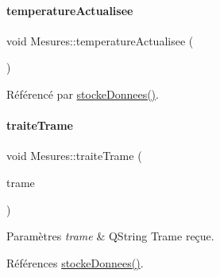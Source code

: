 \paragraph{\texorpdfstring{temperature\+Actualisee}{temperatureActualisee}}
{\footnotesize\ttfamily void Mesures\+::temperature\+Actualisee (\begin{DoxyParamCaption}\item[{double}]{ }\end{DoxyParamCaption})\hspace{0.3cm}{\ttfamily [signal]}}



Référencé par \hyperlink{class_mesures_a77652c2332a9234bf08b463d1d389aa5}{stocke\+Donnees()}.

\mbox{\label{class_mesures_a43b121b67418802b3332b195d8541481}} 
\paragraph{\texorpdfstring{traite\+Trame}{traiteTrame}}
{\footnotesize\ttfamily void Mesures\+::traite\+Trame (\begin{DoxyParamCaption}\item[{Q\+String}]{trame }\end{DoxyParamCaption})\hspace{0.3cm}{\ttfamily [slot]}}


\begin{DoxyParams}{Paramètres}
{\em trame} & Q\+String Trame reçue. \\
\hline
\end{DoxyParams}


Références \hyperlink{class_mesures_a77652c2332a9234bf08b463d1d389aa5}{stocke\+Donnees()}.


